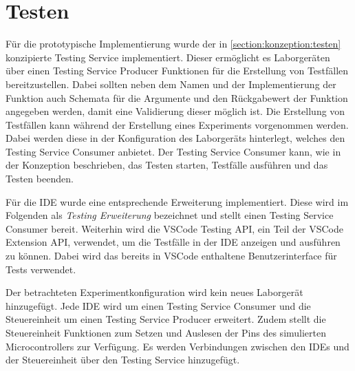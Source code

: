 \section{Testen}\label{section:prototypische-implementierung:testen}


Für die prototypische Implementierung wurde der in \autoref{section:konzeption:testen} konzipierte Testing Service implementiert. Dieser ermöglicht es Laborgeräten über einen Testing Service Producer Funktionen für die Erstellung von Testfällen bereitzustellen. Dabei sollten neben dem Namen und der Implementierung der Funktion auch Schemata für die Argumente und den Rückgabewert der Funktion angegeben werden, damit eine Validierung dieser möglich ist. Die Erstellung von Testfällen kann während der Erstellung eines Experiments vorgenommen werden. Dabei werden diese in der Konfiguration des Laborgeräts hinterlegt, welches den Testing Service Consumer anbietet. Der Testing Service Consumer kann, wie in der Konzeption beschrieben, das Testen starten, Testfälle ausführen und das Testen beenden.

Für die IDE wurde eine entsprechende Erweiterung implementiert. Diese wird im Folgenden als \textit{Testing Erweiterung} bezeichnet und stellt einen Testing Service Consumer bereit. Weiterhin wird die VSCode Testing API, ein Teil der VSCode Extension API, verwendet, um die Testfälle in der IDE anzeigen und ausführen zu können. Dabei wird das bereits in VSCode enthaltene Benutzerinterface für Tests verwendet.

Der betrachteten Experimentkonfiguration wird kein neues Laborgerät hinzugefügt. Jede IDE wird um einen Testing Service Consumer und die Steuereinheit um einen Testing Service Producer erweitert. Zudem stellt die Steuereinheit Funktionen zum Setzen und Auslesen der Pins des simulierten Microcontrollers zur Verfügung. Es werden Verbindungen zwischen den IDEs und der Steuereinheit über den Testing Service hinzugefügt.